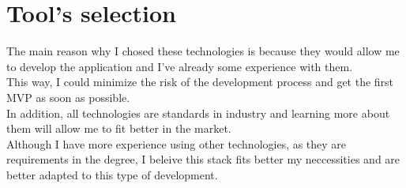 \section{Tool's selection}
The main reason why I chosed these technologies is because they would allow me to develop the application and I've already some experience with them. \\ 

This way, I could minimize the risk of the development process and get the first MVP as soon as possible. \\

In addition, all technologies are standards in industry and learning more about them will allow me to fit better in the market. \\ 

Although I have more experience using other technologies, as they are requirements in the degree, I beleive this stack fits better my neccessities and are better adapted to this type of development.

